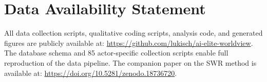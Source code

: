 \documentclass[12pt,a4paper]{article}
\begin{document}
\section*{Data Availability Statement}

\noindent All data collection scripts, qualitative coding scripts, analysis code, and generated figures are publicly available at: \url{https://github.com/lukisch/ai-elite-worldview}. The database schema and 85 actor-specific collection scripts enable full reproduction of the data pipeline. The companion paper on the SWR method is available at: \url{https://doi.org/10.5281/zenodo.18736720}.

\newpage
\end{document}
